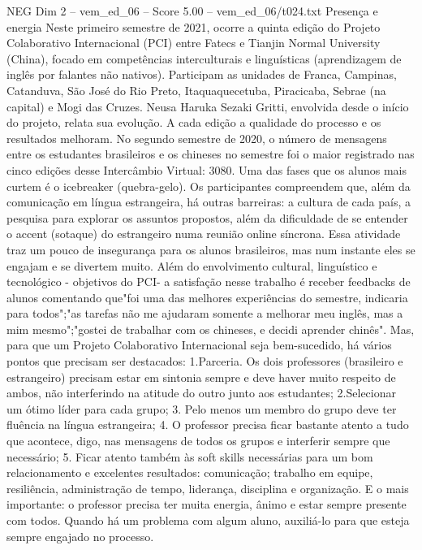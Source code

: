 \begin{textsample}{NEG Dim 2 – vem\_ed\_06 – Score 5.00 – vem\_ed\_06/t024.txt}  \label{ex:f2_neg_099}
Presença e energia Neste primeiro semestre de 2021, ocorre a quinta edição do Projeto Colaborativo Internacional (PCI) entre Fatecs e Tianjin Normal University (China), focado em competências interculturais e linguísticas (aprendizagem de inglês por falantes não nativos).
Participam as unidades de Franca, Campinas, Catanduva, São José do Rio Preto, Itaquaquecetuba, Piracicaba, Sebrae (na capital) e Mogi das Cruzes.
Neusa Haruka Sezaki Gritti, envolvida desde o início do projeto, relata sua evolução.
A cada edição a qualidade do processo e os resultados melhoram.
No segundo semestre de 2020, o número de mensagens entre os estudantes brasileiros e os chineses no semestre foi o maior registrado nas cinco edições desse Intercâmbio Virtual: 3080.
Uma das fases que os alunos mais curtem é o icebreaker (quebra-gelo).
Os participantes compreendem que, além da comunicação em língua estrangeira, há outras barreiras: a cultura de cada país, a pesquisa para explorar os assuntos propostos, além da dificuldade de se entender o accent (sotaque) do estrangeiro numa reunião online síncrona.
Essa atividade traz um pouco de insegurança para os alunos brasileiros, mas num instante eles se engajam e se divertem muito.
Além do envolvimento cultural, linguístico e tecnológico - objetivos do PCI- a satisfação nesse trabalho é receber feedbacks de alunos comentando que"foi uma das melhores experiências do semestre, indicaria para todos";"as tarefas não me ajudaram somente a melhorar meu inglês, mas a mim mesmo";"gostei de trabalhar com os chineses, e decidi aprender chinês".
Mas, para que um Projeto Colaborativo Internacional seja bem-sucedido, há vários pontos que precisam ser destacados: 1.Parceria.
Os dois professores (brasileiro e estrangeiro) precisam estar em sintonia sempre e deve haver muito respeito de ambos, não interferindo na atitude do outro junto aos estudantes; 2.Selecionar um ótimo líder para cada grupo; 3.
Pelo menos um membro do grupo deve ter fluência na língua estrangeira; 4.
O professor precisa ficar bastante atento a tudo que acontece, digo, nas mensagens de todos os grupos e interferir sempre que necessário; 5.
Ficar atento também às soft skills necessárias para um bom relacionamento e excelentes resultados: comunicação; trabalho em equipe, resiliência, administração de tempo, liderança, disciplina e organização.
E o mais importante: o professor precisa ter muita energia, ânimo e estar sempre presente com todos.
Quando há um problema com algum aluno, auxiliá-lo para que esteja sempre engajado no processo.

\end{textsample}
